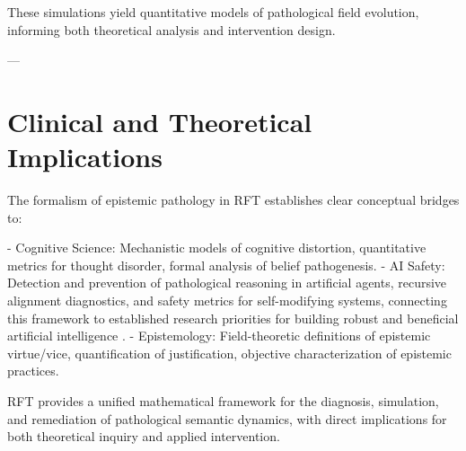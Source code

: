These simulations yield quantitative models of pathological field evolution, informing both theoretical analysis and intervention design.

---

\section{Clinical and Theoretical Implications}

The formalism of epistemic pathology in RFT establishes clear conceptual bridges to:

- Cognitive Science: Mechanistic models of cognitive distortion, quantitative metrics for thought disorder, formal analysis of belief pathogenesis.
- AI Safety: Detection and prevention of pathological reasoning in artificial agents, recursive alignment diagnostics, and safety metrics for self-modifying systems, connecting this framework to established research priorities for building robust and beneficial artificial intelligence \autocite{RussellDeweyTegmark2016}.
- Epistemology: Field-theoretic definitions of epistemic virtue/vice, quantification of justification, objective characterization of epistemic practices.

RFT provides a unified mathematical framework for the diagnosis, simulation, and remediation of pathological semantic dynamics, with direct implications for both theoretical inquiry and applied intervention. 